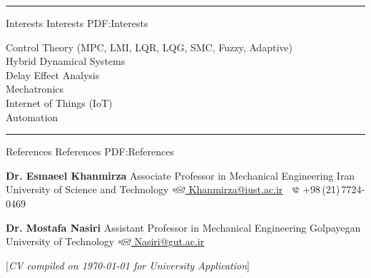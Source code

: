 \documentclass[a4paper,MMMyyyy,nonstopmode]{ResumeTemplate}
\newcommand{\CVNote}{CV compiled on {\today} for University Application}
\begin{document}
\begin{Body}
\textcolor{Forestg}{\hrule height 0.1cm}

\Section
{Interests}
{Interests}
{PDF:Interests}

\Entry
\BulletItem
Control Theory (MPC, LMI, LQR, LQG, SMC, Fuzzy, Adaptive)\\
\BulletItem
Hybrid Dynamical Systems\\
\BulletItem
Delay Effect Analysis\\
\BulletItem
Mechatronics\\
\BulletItem
Internet of Things (IoT)\\
\BulletItem
Automation\\


\textcolor{Forestg}{\hrule height 0.1cm}

\Section
{References}
{References}
{PDF:References}

\BulletItem
\textbf{Dr. Esmaeel Khanmirza}
\newline
Associate Professor in Mechanical Engineering
\newline
Iran University of Science and Technology
\newline
\href{mailto:khanmirza@iust.ac.ir}
{\includegraphics[height=7pt]{icons/SendEmail.png} Khanmirza@iust.ac.ir}
\,\SubBulletSymbol\,
\includegraphics[height=7pt]{icons/phone1.png} +98\,(21)\,7724-0469

\BigGap
\BulletItem
\textbf{Dr. Mostafa Nasiri}
\newline
Assistant Professor in Mechanical Engineering
\newline
Golpayegan University of Technology
\newline
\href{mailto:nasiri@gut.ac.ir}
{\includegraphics[height=7pt]{icons/SendEmail.png} Nasiri@gut.ac.ir}

\end{Body}


\BigGap
\UseNoteFont%
\null\hfill%
[\textit{\CVNote}]
\end{document}
